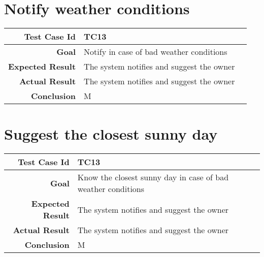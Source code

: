 \section{Notify weather conditions}
\begin{tabularx}{\linewidth}{|r|X|X|}
\hline   {\bf Test Case Id} &  TC13\\
  \hline  {\bf Goal} & Notify in case of bad weather conditions\\
  
  \hline  {\bf Expected Result} & The system notifies and suggest the owner\\
  \hline  {\bf Actual Result} & The system notifies and suggest the owner\\
  \hline  {\bf Conclusion} & M\\
  \hline
  
\end{tabularx}
\section{Suggest the closest sunny day}
\begin{tabularx}{\linewidth}{|r|X|X|}
\hline   {\bf Test Case Id} &  TC13\\
  \hline  {\bf Goal} & Know the closest sunny day in case of bad weather conditions\\
  
  \hline  {\bf Expected Result} & The system notifies and suggest the owner\\
  \hline  {\bf Actual Result} & The system notifies and suggest the owner\\
  \hline  {\bf Conclusion} & M\\
  \hline
  
\end{tabularx}






